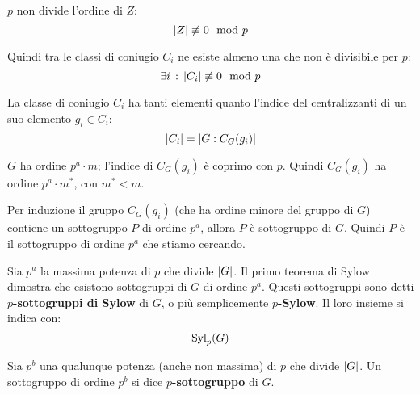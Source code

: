 \begin{dimostrazione}
    $p$ non divide l'ordine di $Z$:
    \begin{equation*}
        \lvert Z \rvert \not\equiv 0 \mod p
    \end{equation*}

    Quindi tra le classi di coniugio $C_i$ ne esiste almeno una che non è divisibile per $p$:
    \begin{equation*}
        \exists i \,:\, \lvert C_i \rvert \not\equiv 0 \mod p
    \end{equation*}

    La classe di coniugio $C_i$ ha tanti elementi quanto l'indice del centralizzanti di un suo elemento $g_i \in C_i$:
    \begin{equation*}
        \lvert C_i \rvert = \lvert G:C_G(g_i) \rvert
    \end{equation*}

    $G$ ha ordine $p^a \cdot m$; l'indice di $C_G(g_i)$ è coprimo con $p$.
    Quindi $C_G(g_i)$ ha ordine $p^a \cdot m^*$,
    con $m^* < m$.

    Per induzione il gruppo $C_G(g_i)$ (che ha ordine minore del gruppo di $G$) contiene un sottogruppo $P$ di ordine
    $p^a$, allora $P$ è sottogruppo di $G$.
    Quindi $P$ è il sottogruppo di ordine $p^a$ che stiamo cercando.
\end{dimostrazione}

Sia $p^a$ la massima potenza di $p$ che divide $\lvert G \rvert$.
Il primo teorema di Sylow dimostra che esistono sottogruppi di $G$ di ordine $p^a$.
Questi sottogruppi sono detti \textbf{$p$-sottogruppi di Sylow} di $G$, o più semplicemente \textbf{$p$-Sylow}.
Il loro insieme si indica con:
\begin{equation*}
    \operatorname{Syl}_p(G)
\end{equation*}

Sia $p^b$ una qualunque potenza (anche non massima) di $p$ che divide $\lvert G \rvert$.
Un sottogruppo di ordine $p^b$ si dice \textbf{$p$-sottogruppo} di $G$.

